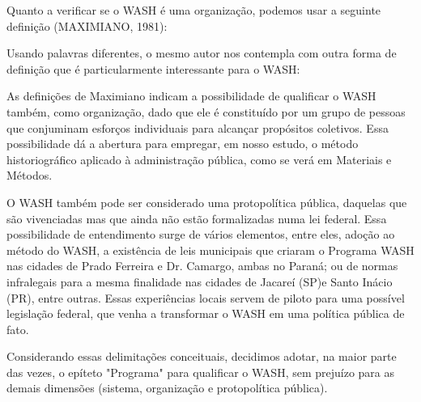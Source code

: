 Quanto a verificar se o WASH é uma organização, podemos usar a seguinte definição (MAXIMIANO, 1981):


\noindent\begin{center}\mbox{\centering{}}\end{center}


Usando palavras diferentes, o mesmo autor nos contempla com outra forma de definição que é particularmente interessante para o WASH:


\noindent\begin{center}\mbox{\centering{}}\end{center}


As definições de Maximiano indicam a possibilidade de qualificar o WASH também, como organização, dado que ele é constituído por um grupo de pessoas que conjuminam esforços individuais para alcançar propósitos coletivos. Essa possibilidade dá a abertura para empregar, em nosso estudo, o método historiográfico aplicado à administração pública, como se verá em Materiais e Métodos.

O WASH também pode ser considerado uma protopolítica pública, daquelas que são vivenciadas mas que ainda não estão formalizadas numa lei federal. Essa possibilidade de entendimento surge de vários elementos, entre eles, adoção ao método do WASH, a existência de leis municipais que criaram o Programa WASH nas cidades de Prado Ferreira e Dr. Camargo, ambas no Paraná; ou de normas infralegais para a mesma finalidade nas cidades de Jacareí (SP)e Santo Inácio (PR), entre outras. Essas experiências locais servem de piloto para uma possível legislação federal, que venha a transformar o WASH em uma política pública de fato.

Considerando essas delimitações conceituais, decidimos adotar, na maior parte das vezes, o epíteto "Programa" para qualificar o WASH, sem prejuízo para as demais dimensões (sistema, organização e protopolítica pública).

